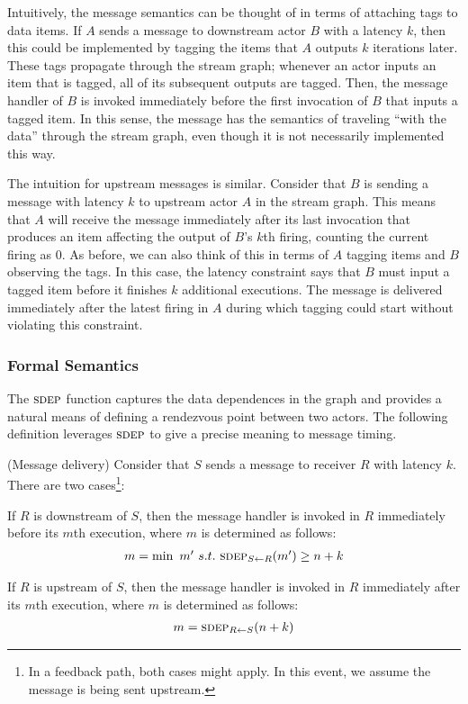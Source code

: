 Intuitively, the message semantics can be thought of in terms of
attaching tags to data items.  If $A$ sends a message to downstream
actor $B$ with a latency $k$, then this could be implemented by
tagging the items that $A$ outputs $k$ iterations later.  These tags
propagate through the stream graph; whenever an actor inputs an item
that is tagged, all of its subsequent outputs are tagged.  Then, the
message handler of $B$ is invoked immediately before the first
invocation of $B$ that inputs a tagged item.  In this sense, the
message has the semantics of traveling ``with the data'' through the
stream graph, even though it is not necessarily implemented this way.

The intuition for upstream messages is similar.  Consider that $B$ is
sending a message with latency $k$ to upstream actor $A$ in the stream
graph.  This means that $A$ will receive the message immediately
after its last invocation that produces an item affecting the output
of $B$'s $k$th firing, counting the current firing as 0.  As before,
we can also think of this in terms of $A$ tagging items and $B$
observing the tags.  In this case, the latency constraint says that
$B$ must input a tagged item before it finishes $k$ additional
executions.  The message is delivered immediately after the latest
firing in $A$ during which tagging could start without violating this
constraint.

\subsubsection*{Formal Semantics}

The $\textsc{sdep}$ function captures the data dependences in the graph and
provides a natural means of defining a rendezvous point between two
actors.  The following definition leverages $\textsc{sdep}$ to give a precise
meaning to message timing.

\begin{definition}(Message delivery)
Consider that $S$ sends a message to receiver $R$ with latency $k$.
There are two cases\footnote{In a feedback path, both cases might
apply.  In this event, we assume the message is being sent upstream.}:

\mybegin

\item If $R$ is downstream of $S$, then the message handler is
invoked in $R$ immediately before its $m$th execution, where $m$ is
determined as follows:
\[
\begin{array}{l}
m = \min~m'~s.t.~\textsc{sdep}_{S \small{\leftarrow} R}(m') \ge n+k
\end{array}
\]

\item If $R$ is upstream of $S$, then the message handler is
invoked in $R$ immediately after its $m$th execution, where $m$ is
determined as follows:
\[
\begin{array}{l}
m = \textsc{sdep}_{R \small{\leftarrow} S}(n + k)
\end{array}
\]
\myend
\end{definition}

